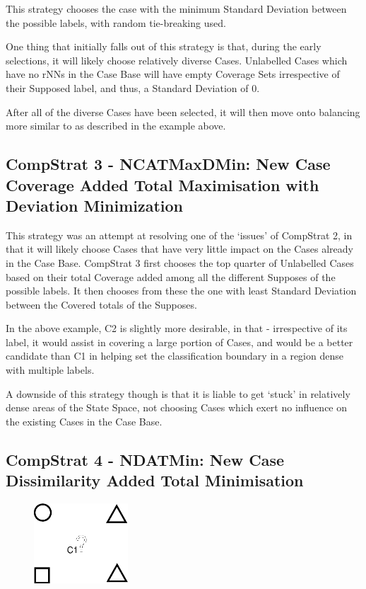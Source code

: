 \documentclass[a4paper,11pt]{report}
\begin{document}
\vspace{10pt}

This strategy chooses the case with the minimum Standard Deviation between the possible labels, with random tie-breaking used.

One thing that initially falls out of this strategy is that, during the early selections, it will likely choose relatively diverse Cases. Unlabelled Cases which have no rNNs in the Case Base will have empty Coverage Sets irrespective of their Supposed label, and thus, a Standard Deviation of 0.

After all of the diverse Cases have been selected, it will then move onto balancing more similar to as described in the example above.

\subsection{CompStrat 3 - NCATMaxDMin: New Case Coverage Added Total Maximisation with Deviation Minimization}
This strategy was an attempt at resolving one of the `issues' of CompStrat 2, in that it will likely choose Cases that have very little impact on the Cases already in the Case Base.  CompStrat 3 first chooses the top quarter of Unlabelled Cases based on their total Coverage added among all the different Supposes of the possible labels. It then chooses from these the one with least Standard Deviation between the Covered totals of the Supposes.

In the above example, C2 is slightly more desirable, in that - irrespective of its label, it would assist in covering a large portion of Cases, and would be a better candidate than C1 in helping set the classification boundary in a region dense with multiple labels.

A downside of this strategy though is that it is liable to get `stuck' in relatively dense areas of the State Space, not choosing Cases which exert no influence on the existing Cases in the Case Base.

\subsection{CompStrat 4 - NDATMin: New Case Dissimilarity Added Total Minimisation}
\begin{figure}[h!] \centering
\includegraphics[width=100pt]{./Drawn/NDATMin}
\end{figure}
\end{document}
